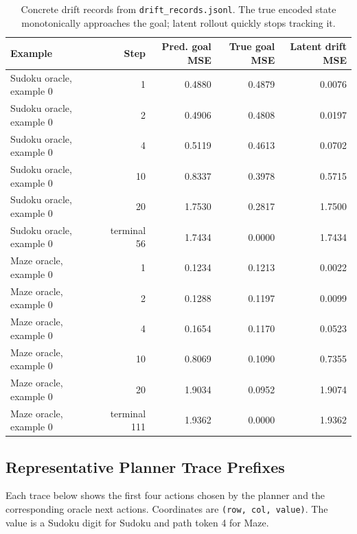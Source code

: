 \documentclass[11pt]{article}
\begin{document}
\begin{table}[H]
\centering
\small
\begin{tabular}{lrrrr}
\toprule
Example & Step & Pred. goal MSE & True goal MSE & Latent drift MSE \\
\midrule
Sudoku oracle, example 0 & 1 & 0.4880 & 0.4879 & 0.0076 \\
Sudoku oracle, example 0 & 2 & 0.4906 & 0.4808 & 0.0197 \\
Sudoku oracle, example 0 & 4 & 0.5119 & 0.4613 & 0.0702 \\
Sudoku oracle, example 0 & 10 & 0.8337 & 0.3978 & 0.5715 \\
Sudoku oracle, example 0 & 20 & 1.7530 & 0.2817 & 1.7500 \\
Sudoku oracle, example 0 & terminal 56 & 1.7434 & 0.0000 & 1.7434 \\
\midrule
Maze oracle, example 0 & 1 & 0.1234 & 0.1213 & 0.0022 \\
Maze oracle, example 0 & 2 & 0.1288 & 0.1197 & 0.0099 \\
Maze oracle, example 0 & 4 & 0.1654 & 0.1170 & 0.0523 \\
Maze oracle, example 0 & 10 & 0.8069 & 0.1090 & 0.7355 \\
Maze oracle, example 0 & 20 & 1.9034 & 0.0952 & 1.9074 \\
Maze oracle, example 0 & terminal 111 & 1.9362 & 0.0000 & 1.9362 \\
\bottomrule
\end{tabular}
\caption{Concrete drift records from \texttt{drift\_records.jsonl}. The true encoded state monotonically approaches the goal; latent rollout quickly stops tracking it.}
\end{table}

\subsection{Representative Planner Trace Prefixes}

Each trace below shows the first four actions chosen by the planner and the
corresponding oracle next actions. Coordinates are \texttt{(row, col, value)}.
The value is a Sudoku digit for Sudoku and path token 4 for Maze.
\end{document}
